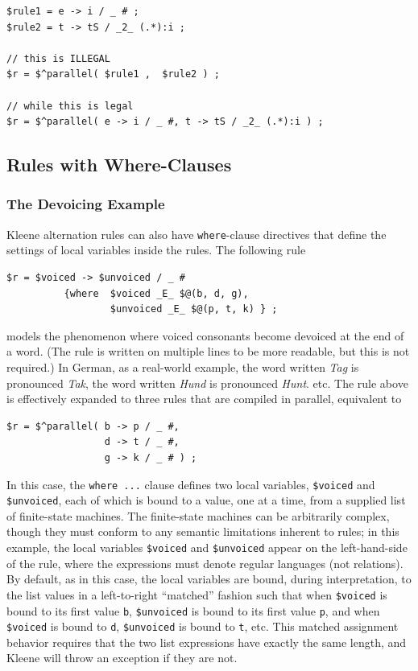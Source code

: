 \begin{Verbatim}
$rule1 = e -> i / _ # ;
$rule2 = t -> tS / _2_ (.*):i ;

// this is ILLEGAL
$r = $^parallel( $rule1 ,  $rule2 ) ;

// while this is legal
$r = $^parallel( e -> i / _ #, t -> tS / _2_ (.*):i ) ;
\end{Verbatim}

\subsection{Rules with Where-Clauses}

\subsubsection{The Devoicing Example}

Kleene alternation rules can also have \texttt{where}-clause directives that define the settings of local variables inside the rules.  The following rule

\begin{Verbatim}
$r = $voiced -> $unvoiced / _ # 
          {where  $voiced _E_ $@(b, d, g), 
                  $unvoiced _E_ $@(p, t, k) } ;
\end{Verbatim}

\noindent
models the phenomenon where voiced consonants become devoiced at the end of a word.  (The rule is written on multiple lines to be
more readable, but this is not required.) In German, as a real-world example, the word
written \emph{Tag} is pronounced \emph{Tak}, the word written \emph{Hund} is pronounced
\emph{Hunt}. etc.  The rule above is effectively expanded to
three rules that are compiled in parallel, equivalent to

\begin{Verbatim}
$r = $^parallel( b -> p / _ #, 
                 d -> t / _ #, 
                 g -> k / _ # ) ;
\end{Verbatim}

\noindent
In this case, the \texttt{{where ...}} clause defines two local variables,
\verb!$voiced! and \verb!$unvoiced!, each of which is bound to a value, one at a
time, from a supplied list of finite-state machines.  The finite-state machines can be
arbitrarily complex, though they must conform to any semantic limitations
inherent to rules; in this example, the local variables \verb!$voiced! and \verb!$unvoiced! appear on
the left-hand-side of the rule, where the expressions must denote regular
languages (not relations).  By default, as in this case, the local variables are
bound, during interpretation, to the list values in a left-to-right ``matched''
fashion such that when \verb!$voiced! is bound to its first value \verb!b!,
\verb!$unvoiced! is
bound to its first value \verb!p!, and when \verb!$voiced! is bound to \verb!d!,
\verb!$unvoiced!
is bound to \verb!t!, etc.  This matched assignment behavior requires that the
two list expressions have exactly the same length, and Kleene will throw an
exception if they are not.  

